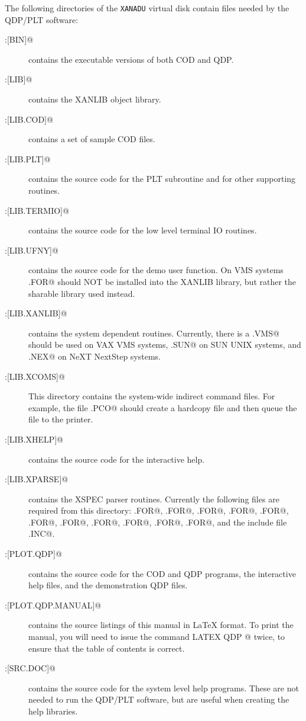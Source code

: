 The following directories of the {\tt XANADU} virtual disk contain
files needed by the QDP/PLT software:
\begin{description}
 \item[{\verb@XANADU:[BIN]@}]
  contains the executable versions of both COD and QDP.
 \item[{\verb@XANADU:[LIB]@}]
  contains the XANLIB object library.
  \item[{\verb@XANADU:[LIB.COD]@}]
   contains a set of sample COD files.
  \item[{\verb@XANADU:[LIB.PLT]@}]
   contains the source code for the PLT subroutine
   and for other supporting routines.
  \item[{\verb@XANADU:[LIB.TERMIO]@}]
   contains the source code for the low level terminal IO routines.
  \item[{\verb@XANADU:[LIB.UFNY]@}]
   contains the source code for the demo user function.  On VMS systems
   \verb@UFNY.FOR@ should NOT be installed into the XANLIB library, but
   rather the sharable library used instead.
  \item[{\verb@XANADU:[LIB.XANLIB]@}]
   contains the system dependent routines.
   Currently, there is a \verb@SYS.VMS@ should be used on VAX VMS systems,
   \verb@SYS.SUN@ on SUN UNIX systems,
   and \verb@SYS.NEX@ on NeXT NextStep systems.
  \item[{\verb@XANADU:[LIB.XCOMS]@}]
   This directory contains the system-wide indirect command files.
   For example, the file \verb@HARD.PCO@ should create a hardcopy file and
   then queue the file to the printer.
  \item[{\verb@XANADU:[LIB.XHELP]@}]
   contains the source code for the interactive help.
  \item[{\verb@XANADU:[LIB.XPARSE]@}]
   contains the XSPEC parser routines.  Currently the following files
   are required from this directory: \verb@IXPLWR.FOR@,
   \verb@XCHKBL.FOR@, \verb@XCHKDL.FOR@, \verb@XCHOSE.FOR@,
   \verb@XCREAD.FOR@, \verb@XGTARG.FOR@, \verb@XMATCH.FOR@,
   \verb@XQMTCH.FOR@, \verb@XQUEST.FOR@, \verb@XSQUEZ.FOR@,
   \verb@XUNIDS.FOR@, and the include file
   \verb@XPARINC.INC@.
 \item[{\verb@XANADU:[PLOT.QDP]@}]
  contains the source code for the COD and QDP programs,
  the interactive help files, and the demonstration QDP files.
 \item[{\verb@XANADU:[PLOT.QDP.MANUAL]@}]
  contains the source listings of this manual in LaTeX format.
  To print the manual,
  you will need to issue the command \verb@ LATEX QDP @ twice,
  to ensure that the table of contents is correct.
 \item[{\verb@XANADU:[SRC.DOC]@}]
  contains the source code for the system level help programs.
  These are not needed to run the QDP/PLT software,
  but are useful when creating the help libraries.
\end{description}

